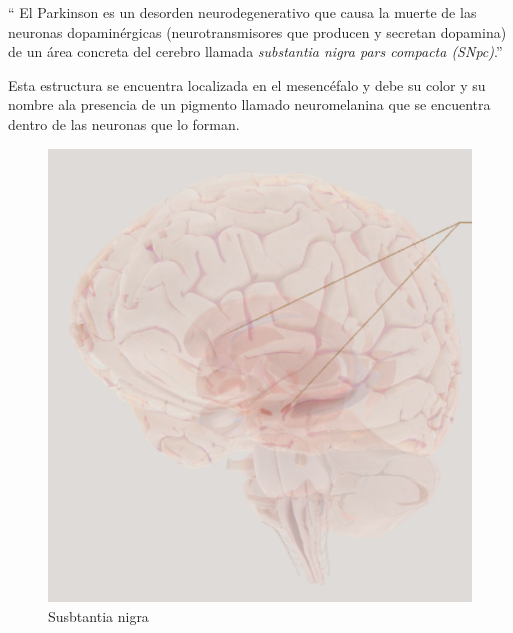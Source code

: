 `` El Parkinson es un desorden neurodegenerativo que causa la muerte de las neuronas dopaminérgicas (neurotransmisores que producen y secretan dopamina) de un área concreta del cerebro llamada \textit{substantia nigra pars compacta (SNpc)}.''

Esta estructura se encuentra localizada en el mesencéfalo y debe su color y su nombre ala presencia de un pigmento llamado neuromelanina que se encuentra dentro de las neuronas que lo forman. 

\begin{figure}[H]
	\begin{minipage}[b]{0.5\linewidth}
		\centering
		\includegraphics[width=\linewidth]{sub-n.png}
		\caption{Susbtantia nigra}
		\label{fig:subs-nig}
	\end{minipage}
	\hspace{0.5cm}
	\begin{minipage}[b]{0.5\linewidth}
		\centering

\end{minipage}
\end{figure}
